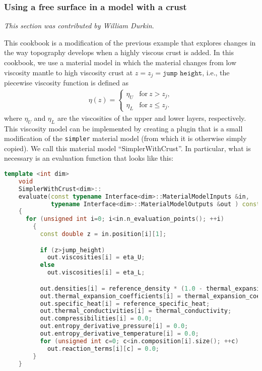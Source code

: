 \subsubsection{Using a free surface in a model with a crust}
\label{sec:cookbooks-freesurfaceWC}
\textit{This section was contributed by William Durkin}.

This cookbook is a modification of the previous example that explores changes in the way topography develops when a 
highly viscous crust is added.  
In this cookbook, we use a material model in which the material changes from low
viscosity mantle to high viscosity crust at $z = z_j = \texttt{jump height}$,
i.e., the piecewise viscosity function is defined as
\begin{align*}
  \eta(z) = \left\{
    \begin{matrix}
      \eta_U & \text{for}\ z > z_j, \\
      \eta_L & \text{for}\ z  \le z_j.
    \end{matrix}
  \right.
\end{align*}
where $\eta_U$ and $\eta_L$ are the viscosities of the upper and lower layers,
respectively. This viscosity model can be implemented by creating a plugin that
is a small modification of the \texttt{simpler} material model (from which it
is otherwise simply copied). We call this material model ``SimplerWithCrust''.
In particular, what is necessary is an evaluation function that looks like this:
\begin{lstlisting}[frame=single,language=C++] 
    template <int dim>
    void
    SimplerWithCrust<dim>::
    evaluate(const typename Interface<dim>::MaterialModelInputs &in, 
             typename Interface<dim>::MaterialModelOutputs &out ) const
    {
      for (unsigned int i=0; i<in.n_evaluation_points(); ++i)
        {
          const double z = in.position[i][1];

          if (z>jump_height)
            out.viscosities[i] = eta_U;
          else
            out.viscosities[i] = eta_L;

          out.densities[i] = reference_density * (1.0 - thermal_expansion_coefficient * (in.temperature[i] - reference_temperature));
          out.thermal_expansion_coefficients[i] = thermal_expansion_coefficient;
          out.specific_heat[i] = reference_specific_heat;
          out.thermal_conductivities[i] = thermal_conductivity;
          out.compressibilities[i] = 0.0;
          out.entropy_derivative_pressure[i] = 0.0;
          out.entropy_derivative_temperature[i] = 0.0;
          for (unsigned int c=0; c<in.composition[i].size(); ++c)
            out.reaction_terms[i][c] = 0.0;
        }
    }
\end{lstlisting}

